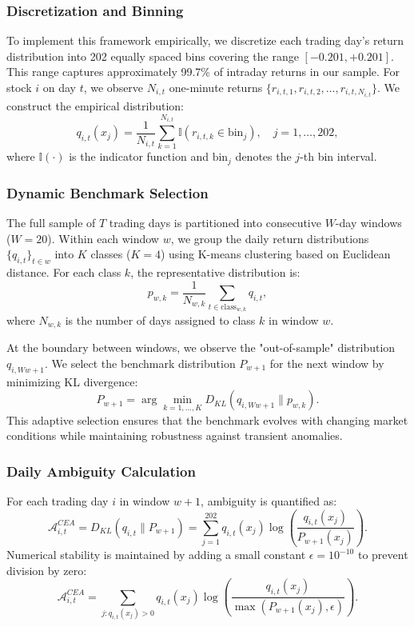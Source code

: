 \documentclass[preprint,12pt,authoryear]{elsarticle}
\begin{document}
\subsubsection{Discretization and Binning}
To implement this framework empirically, we discretize each trading day's return distribution into 202 equally spaced bins covering the range $[-0.201, +0.201]$. This range captures approximately 99.7\% of intraday returns in our sample. For stock $i$ on day $t$, we observe $N_{i,t}$ one-minute returns $\{r_{i,t,1}, r_{i,t,2}, \ldots, r_{i,t,N_{i,t}}\}$. We construct the empirical distribution:
\begin{equation}
q_{i,t}(x_j) = \frac{1}{N_{i,t}} \sum_{k=1}^{N_{i,t}} \mathbb{I}(r_{i,t,k} \in \text{bin}_j), \quad j = 1, \ldots, 202,
\end{equation}
where $\mathbb{I}(\cdot)$ is the indicator function and $\text{bin}_j$ denotes the $j$-th bin interval.

\subsubsection{Dynamic Benchmark Selection}
The full sample of $T$ trading days is partitioned into consecutive $W$-day windows ($W = 20$). Within each window $w$, we group the daily return distributions $\{q_{i,t}\}_{t \in w}$ into $K$ classes ($K = 4$) using K-means clustering based on Euclidean distance. For each class $k$, the representative distribution is:
\begin{equation}
p_{w,k} = \frac{1}{N_{w,k}} \sum_{t \in \text{class}_{w,k}} q_{i,t},
\end{equation}
where $N_{w,k}$ is the number of days assigned to class $k$ in window $w$.

At the boundary between windows, we observe the "out-of-sample" distribution $q_{i,Ww+1}$. We select the benchmark distribution $P_{w+1}$ for the next window by minimizing KL divergence:
\begin{equation}
P_{w+1} = \arg\min_{k=1,\ldots,K} D_{KL}(q_{i,Ww+1} \| p_{w,k}).
\end{equation}
This adaptive selection ensures that the benchmark evolves with changing market conditions while maintaining robustness against transient anomalies.

\subsubsection{Daily Ambiguity Calculation}
For each trading day $i$ in window $w+1$, ambiguity is quantified as:
\begin{equation}
\mathcal{A}^{CEA}_{i,t} = D_{KL}(q_{i,t} \| P_{w+1}) = \sum_{j=1}^{202} q_{i,t}(x_j) \log\left(\frac{q_{i,t}(x_j)}{P_{w+1}(x_j)}\right).
\end{equation}
Numerical stability is maintained by adding a small constant $\epsilon = 10^{-10}$ to prevent division by zero:
\begin{equation}
\mathcal{A}^{CEA}_{i,t} = \sum_{j: q_{i,t}(x_j) > 0} q_{i,t}(x_j) \log\left(\frac{q_{i,t}(x_j)}{\max(P_{w+1}(x_j), \epsilon)}\right).
\end{equation}
\end{document}
